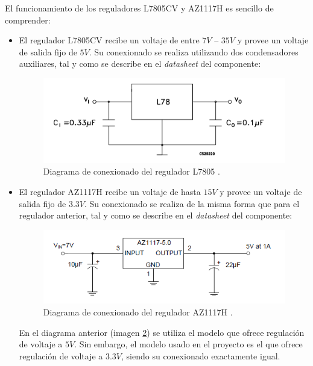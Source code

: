 El funcionamiento de los reguladores L7805CV y AZ1117H es sencillo de comprender:
\begin{itemize}
    \item El regulador L7805CV recibe un voltaje de entre $7V$ -- $35V$ y provee un voltaje de salida fijo de $5V$. Su conexionado se realiza utilizando dos condensadores auxiliares, tal y como se describe en el \textit{datasheet} del componente:
    
    \begin{figure}[H]
    \centering 
    \includegraphics[width=.75\linewidth]{pictures/L7805Datasheet.PNG}
    \caption{Diagrama de conexionado del regulador L7805 \cite{noauthor_L7805CV_nodate}.}
    \label{fig:L7805_Conexionado}
    \end{figure}
    
    \item El regulador AZ1117H recibe un voltaje de hasta $15V$ y provee un voltaje de salida fijo de $3.3V$. Su conexionado se realiza de la misma forma que para el regulador anterior, tal y como se describe en el \textit{datasheet} del componente:
    
    \begin{figure}[H]
    \centering 
    \includegraphics[width=.75\linewidth]{pictures/AZ1117Hdatasheet.PNG}
    \caption{Diagrama de conexionado del regulador AZ1117H \cite{noauthor_AZ1117H_nodate}.}
    \label{fig:AZ1117H_Conexionado}
    \end{figure}
    
    En el diagrama anterior (imagen \ref{fig:AZ1117H_Conexionado}) se utiliza el modelo que ofrece regulación de voltaje a $5V$. Sin embargo, el modelo usado en el proyecto es el que ofrece regulación de voltaje a $3.3V$, siendo su conexionado exactamente igual.
    
\end{itemize}


